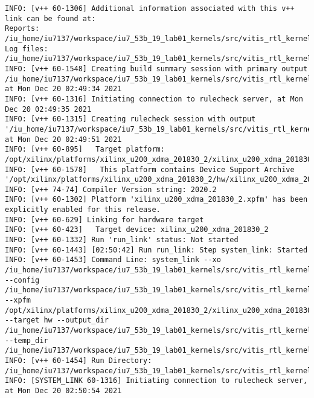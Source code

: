\begin{center}
    \captionsetup{justification=raggedright,singlelinecheck=off}
    \begin{lstlisting}[label=lst:vlog,caption=Файл v++\_vinc.log]
INFO: [v++ 60-1306] Additional information associated with this v++ link can be found at:
Reports: /iu_home/iu7137/workspace/iu7_53b_19_lab01_kernels/src/vitis_rtl_kernel/rtl_kernel_wizard_1/_x/reports/link
Log files: /iu_home/iu7137/workspace/iu7_53b_19_lab01_kernels/src/vitis_rtl_kernel/rtl_kernel_wizard_1/_x/logs/link
INFO: [v++ 60-1548] Creating build summary session with primary output /iu_home/iu7137/workspace/iu7_53b_19_lab01_kernels/src/vitis_rtl_kernel/rtl_kernel_wizard_1/vinc.xclbin.link_summary, at Mon Dec 20 02:49:34 2021
INFO: [v++ 60-1316] Initiating connection to rulecheck server, at Mon Dec 20 02:49:35 2021
INFO: [v++ 60-1315] Creating rulecheck session with output '/iu_home/iu7137/workspace/iu7_53b_19_lab01_kernels/src/vitis_rtl_kernel/rtl_kernel_wizard_1/_x/reports/link/v++_link_vinc_guidance.html', at Mon Dec 20 02:49:51 2021
INFO: [v++ 60-895]   Target platform: /opt/xilinx/platforms/xilinx_u200_xdma_201830_2/xilinx_u200_xdma_201830_2.xpfm
INFO: [v++ 60-1578]   This platform contains Device Support Archive '/opt/xilinx/platforms/xilinx_u200_xdma_201830_2/hw/xilinx_u200_xdma_201830_2.dsa'
INFO: [v++ 74-74] Compiler Version string: 2020.2
INFO: [v++ 60-1302] Platform 'xilinx_u200_xdma_201830_2.xpfm' has been explicitly enabled for this release.
INFO: [v++ 60-629] Linking for hardware target
INFO: [v++ 60-423]   Target device: xilinx_u200_xdma_201830_2
INFO: [v++ 60-1332] Run 'run_link' status: Not started
INFO: [v++ 60-1443] [02:50:42] Run run_link: Step system_link: Started
INFO: [v++ 60-1453] Command Line: system_link --xo /iu_home/iu7137/workspace/iu7_53b_19_lab01_kernels/src/vitis_rtl_kernel/rtl_kernel_wizard_1/rtl_kernel_wizard_1.xo --config /iu_home/iu7137/workspace/iu7_53b_19_lab01_kernels/src/vitis_rtl_kernel/rtl_kernel_wizard_1/_x/link/int/syslinkConfig.ini --xpfm /opt/xilinx/platforms/xilinx_u200_xdma_201830_2/xilinx_u200_xdma_201830_2.xpfm --target hw --output_dir /iu_home/iu7137/workspace/iu7_53b_19_lab01_kernels/src/vitis_rtl_kernel/rtl_kernel_wizard_1/_x/link/int --temp_dir /iu_home/iu7137/workspace/iu7_53b_19_lab01_kernels/src/vitis_rtl_kernel/rtl_kernel_wizard_1/_x/link/sys_link
INFO: [v++ 60-1454] Run Directory: /iu_home/iu7137/workspace/iu7_53b_19_lab01_kernels/src/vitis_rtl_kernel/rtl_kernel_wizard_1/_x/link/run_link
INFO: [SYSTEM_LINK 60-1316] Initiating connection to rulecheck server, at Mon Dec 20 02:50:54 2021

\end{lstlisting}
\end{center}
